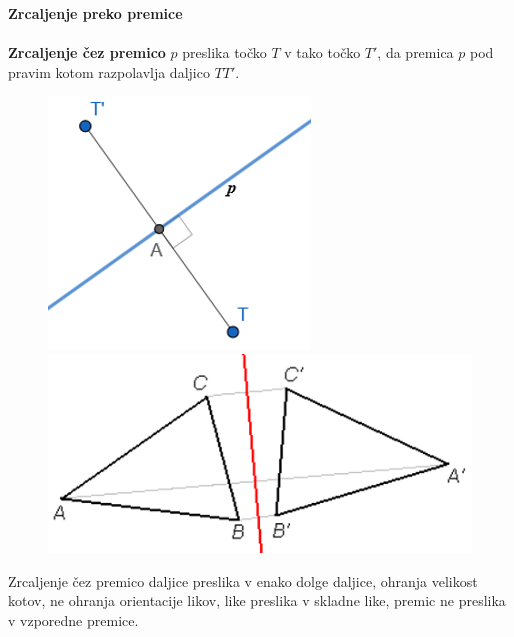         \begin{frame}
            \large\textbf{Zrcaljenje preko premice}
            ~\\
            ~\\
            \normalsize
            \textbf{Zrcaljenje čez premico} $p$ preslika točko $T$ v tako točko $T'$, da premica $p$ pod pravim kotom razpolavlja daljico $TT'$.
            
            \begin{figure}
                \includegraphics[scale=0.5]{Slike in skice/Zrcaljenje_tocke_cez_premico.png}
                \includegraphics[scale=0.5]{Slike in skice/Zrcaljenje_lika_cez_premico.png}
            \end{figure}

            Zrcaljenje čez premico daljice preslika v enako dolge daljice, ohranja velikost kotov, ne ohranja orientacije likov, like preslika v skladne like, premic ne preslika v vzporedne premice.

        \end{frame}


